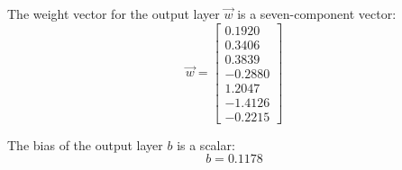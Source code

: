 \documentclass[metals,article,accept,pdftex,moreauthors]{Definitions/mdpi}
\begin{document}
{The} weight vector for the output layer $\overrightarrow{w}$ is a seven-component vector:
\begin{equation*}
\overrightarrow{w} = \left[
\begin{array}{r}
0.1920 \\
0.3406 \\
0.3839 \\
-0.2880 \\
1.2047 \\
-1.4126 \\
-0.2215
\end{array}\right]
\end{equation*}

{The} bias of the output layer $b$ is a scalar:
\begin{equation*}
b = 0.1178
\end{equation*}
\end{document}
